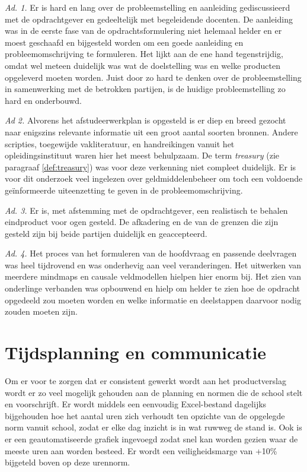\documentclass[10pt,a4paper,oneside]{report}
\begin{document}
\noindent
\textit{Ad. 1.} Er is hard en lang over de probleemstelling en aanleiding gediscussieerd met de opdrachtgever en gedeeltelijk met begeleidende docenten. De aanleiding was in de eerste fase van de opdrachtsformulering niet helemaal helder en er moest geschaafd en bijgesteld worden om een goede aanleiding en probleemomschrijving te formuleren. Het lijkt aan de ene hand tegenstrijdig, omdat wel meteen duidelijk was wat de doelstelling was en welke producten opgeleverd moeten worden. Juist door zo hard te denken over de probleemstelling in samenwerking met de betrokken partijen, is de huidige probleemstelling zo hard en onderbouwd. 

\bigskip
\noindent
\textit{Ad 2.} Alvorens het afstudeerwerkplan is opgesteld is er diep en breed gezocht naar enigszins relevante informatie uit een groot aantal soorten bronnen. Andere scripties, toegewijde vakliteratuur, en handreikingen vanuit het opleidingsinstituut waren hier het meest behulpzaam. De term \textit{treasury} (zie paragraaf \ref{def:treasury}) was voor deze verkenning niet compleet duidelijk. Er is voor dit onderzoek veel ingelezen over geldmiddelenbeheer om toch een voldoende geïnformeerde uiteenzetting te geven in de probleemomschrijving. 

\bigskip
\noindent
\textit{Ad. 3.} Er is, met afstemming met de opdrachtgever, een realistisch te behalen eindproduct voor ogen gesteld. De afkadering en de van de grenzen die zijn gesteld zijn bij beide partijen duidelijk en geaccepteerd.

\bigskip
\noindent
\textit{Ad. 4.} Het proces van het formuleren van de hoofdvraag en passende deelvragen was heel tijdrovend en was onderhevig aan veel veranderingen. Het uitwerken van meerdere mindmaps en causale veldmodellen hielpen hier enorm bij. Het zien van onderlinge verbanden was opbouwend en hielp om helder te zien hoe de opdracht opgedeeld zou moeten worden en welke informatie en deelstappen daarvoor nodig zouden moeten zijn.
\citep{competenties}

\chapter{Tijdsplanning en communicatie}
Om er voor te zorgen dat er consistent gewerkt wordt aan het productverslag wordt er zo veel mogelijk gehouden aan de planning en normen die de school stelt en voorschrijft. Er wordt middels een eenvoudig Excel-bestand dagelijks bijgehouden hoe het aantal uren zich verhoudt ten opzichte van de opgelegde norm vanuit school, zodat er elke dag inzicht is in wat ruwweg de stand is. Ook is er een geautomatiseerde grafiek ingevoegd zodat snel kan worden gezien waar de meeste uren aan worden besteed. Er wordt een veiligheidsmarge van +10\% bijgeteld boven op deze urennorm. 
\end{document}
